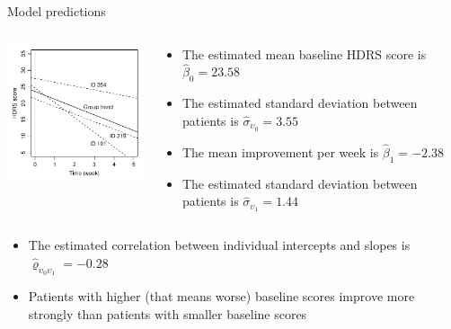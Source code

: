 \documentclass[aspectratio=169]{beamer}
\begin{document}
\begin{frame}{Model predictions}
\begin{columns}
  \begin{column}{.4\textwidth}
    \includegraphics[width=5cm]{fig/hdrs-lme2}
  \end{column}
  \begin{column}{.6\textwidth}
    \begin{itemize}
      \item The estimated mean baseline HDRS score is $\hat{\beta}_0 = 23.58$
      \item The estimated standard deviation between patients is
        $\hat{\sigma}_{\upsilon_0} = 3.55$
      \item The mean improvement per week is $\hat{\beta}_1 = -2.38$
      \item The estimated standard deviation between patients is
        $\hat{\sigma}_{\upsilon_1} = 1.44$
    \end{itemize}
  \end{column}
\end{columns}
  \begin{itemize}
    \item The estimated correlation between individual intercepts and
      slopes is $\hat{\varrho}_{\upsilon_0 \upsilon_1} = -0.28$
    \item Patients with higher (that means worse) baseline scores improve
      more strongly than patients with smaller baseline scores
  \end{itemize}
\end{frame}
\end{document}

